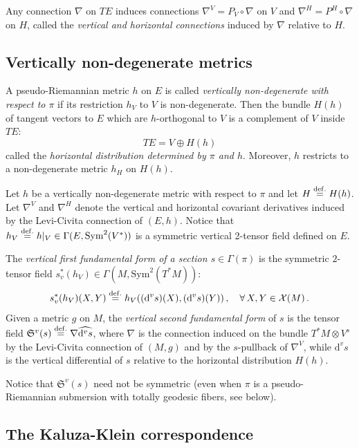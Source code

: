 \documentclass[10pt, cmp, numbook, final, a4paper]{svjour}
\newcommand{\Sym}{\mathrm{Sym}}
\newcommand{\eqdef}{\stackrel{{\rm def.}}{=}}
\def\dd{\mathrm{d}}
\newcommand{\be}{\begin{equation*}}
\newcommand{\ee}{\end{equation*}}
\def\cX{\mathcal{X}}
\def\cX{\mathcal{X}}
\begin{document}
Any connection $\nabla$ on $T E$ induces connections
$\nabla^V=P_V\circ \nabla$ on $V$ and $\nabla^H=P^H\circ \nabla$ on
$H$, called the {\em vertical and horizontal connections} induced by
$\nabla$ relative to $H$.


\subsection{Vertically non-degenerate metrics}

A pseudo-Riemannian metric $h$ on $E$ is called {\em vertically
non-degenerate with respect to $\pi$} if its restriction $h_V$ to $V$
is non-degenerate. Then the bundle $H(h)$ of tangent vectors to $E$
which are $h$-orthogonal to $V$ is a complement of $V$ inside $TE$:
\be
TE=V \oplus H(h)
\ee
called the {\em horizontal distribution determined by $\pi$ and
$h$}. Moreover, $h$ restricts to a non-degenerate metric $h_H$ on
$H(h)$.

Let $h$ be a vertically non-degenerate metric with respect to
$\pi$ and let $H\eqdef H(h)$. Let $\nabla^V$ and $\nabla^H$
denote the vertical and horizontal covariant derivatives induced by the
Levi-Civita connection of $(E,h)$. Notice that $h_V\eqdef
h|_V\in \Gamma(E,\Sym^2(V^\ast))$ is a symmetric vertical
2-tensor field defined on $E$. 

\begin{definition}
The {\em vertical first fundamental form of a section $s\in
   \Gamma(\pi)$} is the symmetric $2$-tensor field $s^\ast_v(h_V)\in
 \Gamma(M,\Sym^2(T^\ast M))$:
\begin{equation*}
s^\ast_v(h_V)(X,Y)\eqdef h_V((\dd^v s)(X),(\dd^v s)(Y))\, , \quad \forall\, X,Y\in \cX(M)\, .
\end{equation*}
Given a metric $g$ on $M$, the {\em vertical second fundamental form}
of $s$ is the tensor field $\mathfrak{S}^v(s)\eqdef \nabla
\widehat{\dd^v s}$, where $\nabla$ is the connection induced on the
bundle $T^\ast M\otimes V^s$ by the Levi-Civita connection of $(M,g)$
and by the $s$-pullback of $\nabla^V$, while $\dd^v s$ is the vertical
differential of $s$ relative to the horizontal distribution $H(h)$.
\end{definition}

\begin{remark}
Notice that $\mathfrak{S}^v(s)$ need not be symmetric (even when $\pi$
is a pseudo-Riemannian submersion with totally geodesic fibers, see
below).
\end{remark}

\subsection{The Kaluza-Klein correspondence}
\end{document}
